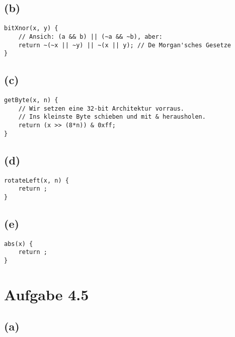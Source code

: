 \documentclass[12pt]{article}
\begin{document}
\subsection{(b)}
\begin{verbatim}
bitXnor(x, y) {
    // Ansich: (a && b) || (~a && ~b), aber:
    return ~(~x || ~y) || ~(x || y); // De Morgan'sches Gesetze
}
\end{verbatim}

\subsection{(c)}
\begin{verbatim}
getByte(x, n) {
    // Wir setzen eine 32-bit Architektur vorraus.
    // Ins kleinste Byte schieben und mit & herausholen.
    return (x >> (8*n)) & 0xff;
}
\end{verbatim}

\subsection{(d)}
\begin{verbatim}
rotateLeft(x, n) {
    return ;
}
\end{verbatim}

\subsection{(e)}
\begin{verbatim}
abs(x) {
    return ;
}
\end{verbatim}

\section{Aufgabe 4.5}
\subsection{(a)}
\begin{align}
\end{align}
\end{document}
